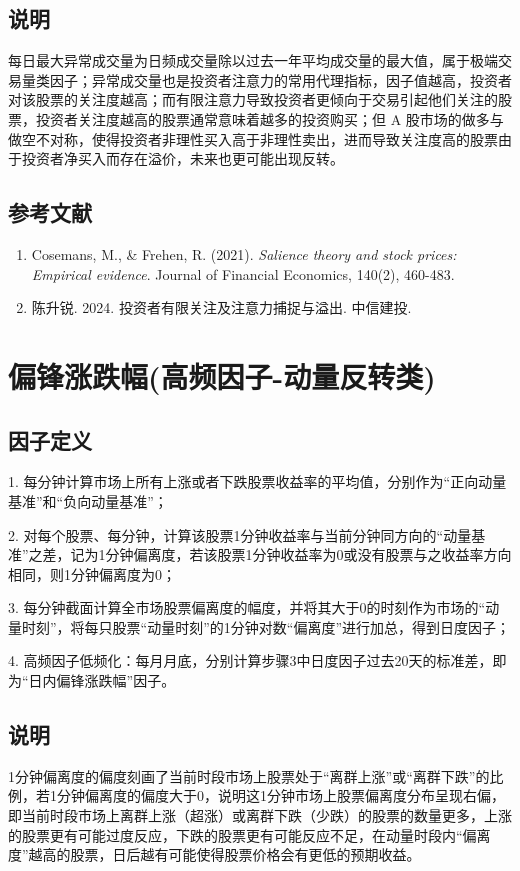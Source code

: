 \documentclass{article}
\begin{document}
\subsection{说明}
每日最大异常成交量为日频成交量除以过去一年平均成交量的最大值，属于极端交易量类因子；异常成交量也是投资者注意力的常用代理指标，因子值越高，投资者对该股票的关注度越高；而有限注意力导致投资者更倾向于交易引起他们关注的股票，投资者关注度越高的股票通常意味着越多的投资购买；但 A 股市场的做多与做空不对称，使得投资者非理性买入高于非理性卖出，进而导致关注度高的股票由于投资者净买入而存在溢价，未来也更可能出现反转。

\subsection{参考文献}
\begin{enumerate}
    \item Cosemans, M., \& Frehen, R. (2021). \textit{Salience theory and stock prices: Empirical evidence}. Journal of Financial Economics, 140(2), 460-483.
    \item 陈升锐. 2024. 投资者有限关注及注意力捕捉与溢出. 中信建投.
\end{enumerate}

\section{偏锋涨跌幅(高频因子-动量反转类)}

\subsection{因子定义}

1. 每分钟计算市场上所有上涨或者下跌股票收益率的平均值，分别作为“正向动量基准”和“负向动量基准”；

2. 对每个股票、每分钟，计算该股票1分钟收益率与当前分钟同方向的“动量基准”之差，记为1分钟偏离度，若该股票1分钟收益率为0或没有股票与之收益率方向相同，则1分钟偏离度为0；

3. 每分钟截面计算全市场股票偏离度的幅度，并将其大于0的时刻作为市场的“动量时刻”，将每只股票“动量时刻”的1分钟对数“偏离度”进行加总，得到日度因子；

4. 高频因子低频化：每月月底，分别计算步骤3中日度因子过去20天的标准差，即为“日内偏锋涨跌幅”因子。

\subsection{说明}
1分钟偏离度的偏度刻画了当前时段市场上股票处于“离群上涨”或“离群下跌”的比例，若1分钟偏离度的偏度大于0，说明这1分钟市场上股票偏离度分布呈现右偏，即当前时段市场上离群上涨（超涨）或离群下跌（少跌）的股票的数量更多，上涨的股票更有可能过度反应，下跌的股票更有可能反应不足，在动量时段内“偏离度”越高的股票，日后越有可能使得股票价格会有更低的预期收益。
\end{document}
